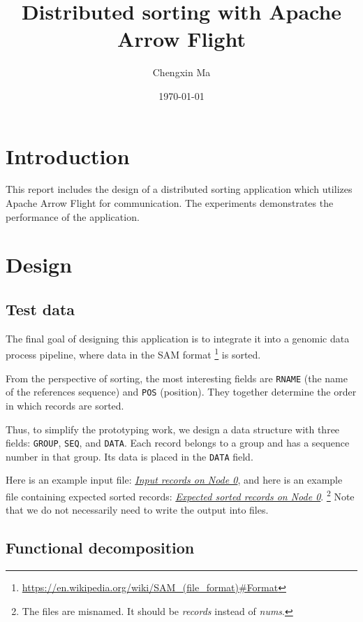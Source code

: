 \documentclass{article}
\title{Distributed sorting with Apache Arrow Flight}
\author{Chengxin Ma}
\date{\today}
\begin{document}
\maketitle

\section{Introduction}
This report includes the design of a distributed sorting application which utilizes Apache Arrow Flight for communication.
The experiments demonstrates the performance of the application.

\section{Design}
\subsection{Test data}
The final goal of designing this application is to integrate it into a genomic data process pipeline, where data in the SAM format
\footnote{\url{https://en.wikipedia.org/wiki/SAM_(file_format)\#Format}} is sorted.

From the perspective of sorting, the most interesting fields are \texttt{RNAME} (the name of the references sequence) and \texttt{POS} (position).
They together determine the order in which records are sorted.

Thus, to simplify the prototyping work, we design a data structure with three fields: \texttt{GROUP}, \texttt{SEQ}, and \texttt{DATA}.
Each record belongs to a group and has a sequence number in that group.
Its data is placed in the \texttt{DATA} field.

Here is an example input file: \href{https://github.com/MaChengxin/playground/blob/master/arrow/flight/my_flight/data/nums_on_node_0.txt}{\textit{Input records on Node 0}},
and here is an example file containing expected sorted records: \href{https://github.com/MaChengxin/playground/blob/master/arrow/flight/my_flight/data/expected_nums_on_node_0.txt}{\textit{Expected sorted records on Node 0}}.
\footnote{The files are misnamed. It should be \textit{records} instead of \textit{nums}.}
Note that we do not necessarily need to write the output into files.

\subsection{Functional decomposition}
\end{document}
